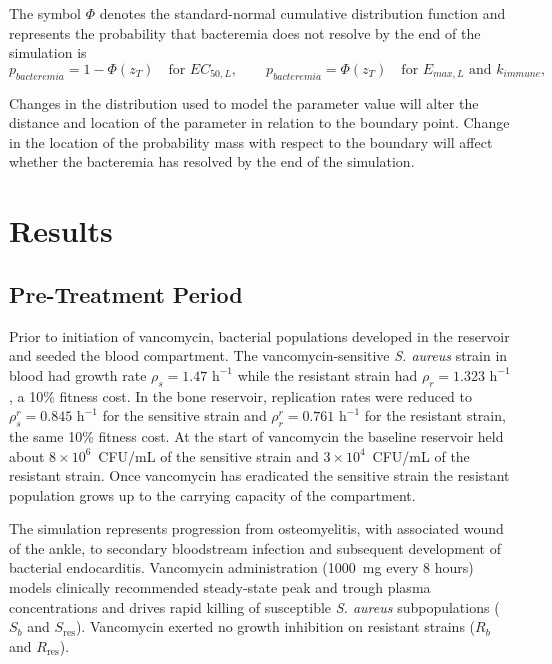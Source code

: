 \documentclass[utf8]{FrontiersinHarvard} %
\begin{document}
The symbol $\Phi$ denotes the standard-normal cumulative distribution function and represents the
probability that bacteremia does not resolve by the end of the simulation is
\begin{equation}
p_{bacteremia}=1-\Phi(z_T) \quad \text{for } EC_{50,L}, \qquad
p_{bacteremia}=\Phi(z_T) \quad \text{for } E_{max,L}\text{ and }k_{immune},
\label{eq:lognormal-bacteremia-tail}
\end{equation}

Changes in the distribution used to model the parameter value will alter the distance and location of the parameter in relation to the boundary point.  Change in the location of the probability mass with respect to the boundary will affect whether the bacteremia has resolved by the end of the simulation.

\section{Results}

\subsection{Pre-Treatment Period}
Prior to initiation of vancomycin, bacterial populations developed in the reservoir and seeded the blood compartment. The vancomycin-sensitive \textit{S. aureus} strain in blood had growth rate $\rho_s = 1.47\text{ h}^{-1}$ while the resistant strain had $\rho_r = 1.323\text{ h}^{-1}$, a 10\% fitness cost. In the bone reservoir, replication rates were reduced to $\rho_s^r = 0.845\text{ h}^{-1}$ for the sensitive strain and $\rho_r^r = 0.761\text{ h}^{-1}$ for the resistant strain, the same 10\% fitness cost.
At the start of vancomycin the baseline reservoir held about $8\times10^{6}$~CFU/mL of the
sensitive strain and $3\times10^{4}$~CFU/mL of the resistant strain.
Once vancomycin has eradicated the sensitive strain the resistant population grows up to the carrying capacity of the compartment.

The simulation represents progression from osteomyelitis, with associated wound of the ankle, to secondary bloodstream infection and subsequent development of bacterial endocarditis. Vancomycin administration (1000~mg every 8 hours) models clinically recommended steady-state peak and trough plasma concentrations and drives rapid killing of susceptible \textit{S. aureus} subpopulations ($S_b$ and $S_{\text{res}}$). Vancomycin exerted no growth inhibition on resistant strains ($R_b$ and $R_{\text{res}}$).
\end{document}

